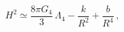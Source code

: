 \begin{equation}H^2 \simeq \frac{8\pi G_4}{3}\,\Lambda_4-\frac{k}{R^2}+
\frac{b}{R^4}\,,
\end{equation}

